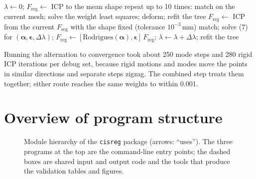 \documentclass[10pt]{article}
\newcommand{\F}{F_{\mathrm{reg}}}
\begin{document}
\begin{algorithm}[H]
\caption{Deformable registration (\texttt{deformable.deformable\_registration})}
\begin{algorithmic}[1]
\State $\lambda\gets0$; $\F\gets$ ICP to the mean shape
 
  \State repeat up to 10 times: match on the current mesh; solve the weight least squares; deform; refit the tree
  \State $\F\gets$ ICP from the current $\F$ with the shape fixed (tolerance $10^{-3}$\,mm)
\EndFor
\Repeat {}
  \State match; solve (7) for $(\boldsymbol\alpha,\boldsymbol\epsilon,\Delta\lambda)$; $\F\gets[\mathrm{Rodrigues}(\boldsymbol\alpha),\boldsymbol\epsilon]\,\F$; $\lambda\gets\lambda+\Delta\lambda$; refit the tree
\end{algorithmic}
\end{algorithm}
Running the alternation to convergence took about 250 mode steps and 280 rigid ICP iterations per debug set, because rigid motions and modes move the points in similar directions and separate steps zigzag. The combined step treats them together; either route reaches the same weights to within 0.001.

\section{Overview of program structure}

\begin{figure}[H]
\centering
{}
\caption{Module hierarchy of the \texttt{cisreg} package (arrows: ``uses''). The three programs at the top are the command-line entry points; the dashed boxes are shared input and output code and the tools that produce the validation tables and figures.}
\end{figure}
\end{document}
